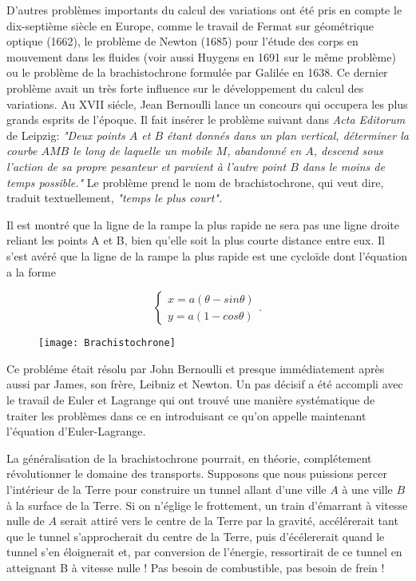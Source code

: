 \documentclass[10pt,a4paper]{article}%
\theoremstyle{theorem}
\theoremstyle{definition}
\begin{document}
	
	D'autres problèmes importants du calcul des variations ont été pris en compte le dix-septième siècle en Europe, comme le travail de Fermat sur géométrique optique (1662), le problème de Newton (1685) pour l'étude des corps en mouvement dans les fluides (voir aussi Huygens en 1691 sur le même problème) ou le problème de la brachistochrone formulée par Galilée en 1638. Ce dernier problème avait un très forte influence sur le développement du calcul des variations.  Au XVII siécle, Jean Bernoulli lance un concours qui occupera les plus grands esprits de l'époque. Il fait insérer le problème suivant dans \textit{Acta Editorum} de Leipzig: \textit{"Deux points $A$ et $B$ étant donnés dans un plan vertical, déterminer la courbe $AMB$ le long de laquelle un mobile $M$, abandonné en $A$, descend sous l'action de sa propre pesanteur et parvient à l'autre point $B$ dans le moins de temps possible."} Le problème prend le nom de brachistochrone, qui veut dire, traduit textuellement, \textit{"temps le plus court".} 
	
	Il est montré que la ligne de la rampe la plus rapide ne sera pas une ligne droite reliant les points A et B, bien qu'elle soit la plus courte distance entre eux. Il s'est avéré que la ligne de la rampe la plus rapide est une cycloïde dont l'équation a la forme
		 	
	 \begin{equation*}
	 	\begin{cases}
		 	x=a(\theta-sin\theta)
		 	\\
	 		y=a(1-cos\theta)
	 	\end{cases}.
 	\end{equation*}
 	
 	\begin{figure}[h]
 	
 		\begin{center}
 			\texttt{[image: Brachistochrone]}
 		\end{center}
 	\caption{}\label{brach.figure}
 	\end{figure}
 	
 	
 	Ce probléme était résolu par John Bernoulli et presque immédiatement après aussi par James, son frère, Leibniz et Newton. Un pas décisif a été accompli avec le travail de Euler et Lagrange qui ont trouvé une manière systématique de traiter les problèmes dans ce en introduisant ce qu'on appelle maintenant l'équation d'Euler-Lagrange. 
 	
 	La généralisation de la brachistochrone pourrait, en théorie, complétement révolutionner le domaine des transports. Supposons que nous puissions percer l’intérieur de la Terre pour construire un tunnel allant d’une ville $A$ à une ville $B$ à la surface de la Terre. Si on n'églige le frottement, un train d'émarrant à vitesse nulle de $A$ serait attiré vers le centre de la Terre par la gravité, accélérerait tant que le tunnel s'approcherait du centre de la Terre, puis d'écélererait quand le tunnel s'en éloignerait et, par conversion de l'énergie, ressortirait de ce tunnel en atteignant B à vitesse nulle ! Pas besoin de combustible, pas besoin de frein ! 	
	 
\end{document}
